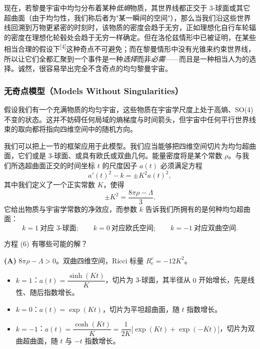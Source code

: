 现在，若黎曼宇宙中均匀分布着某种\emph{低熵}物质，其世界线都正交于 3-球面或其它超曲面（由于均匀性，我们称后者为"某一瞬间的空间"），那么当我们沿这些世界线回溯到万物更紧密的时刻时，该物质的密度会趋于无穷，正如理想化自行车轮辐的密度在理想化轮毂处会趋于无穷一样确定。但在洛伦兹情形中已被证明，在某些相当合理的假设下\textsuperscript{[4]}这种奇点不可避免；而在黎曼情形中没有光锥来约束世界线，所以让它们全都汇聚到一个事件是一种\emph{选择}而非\emph{必需}——而且是一种相当人为的选择。诚然，很容易举出完全不含奇点的均匀黎曼宇宙。

\subsubsection{无奇点模型（Models Without Singularities）}

假设我们有一个充满物质的均匀宇宙，这些物质在宇宙学尺度上处于高熵、SO(4) 不变的状态。这并不妨碍任何局域的熵梯度与时间箭头，但宇宙中任何平行世界线束的取向都将指向四维空间中的随机方向。

我们可以把上一节的框架应用于此模型。我们应当能够把四维空间切片为均匀超曲面，它们或是 3-球面、或具有欧氏或双曲几何。能量密度将是某个常数 $\rho$。与我们所选超曲面正交的时间坐标 $t$ 的尺度因子 $a(t)$ 必须满足方程
\begin{equation*}
a'(t)^{2}-k=\pm K^{2}a(t)^{2},
\tag{6}
\end{equation*}
其中我们定义了一个正实常数 $K$，使得
\begin{equation*}
\pm K^{2}=\frac{8\pi\rho-\Lambda}{3}.
\end{equation*}
它给出物质与宇宙学常数的净效应，而参数 $k$ 告诉我们所拥有的是何种均匀超曲面：
\begin{equation*}
k=1\ \text{对应 3-球面};\qquad
k=0\ \text{对应欧氏空间};\qquad
k=-1\ \text{对应双曲空间}.
\end{equation*}

方程 (6) 有哪些可能的解？

\textbf{(A)} $8\pi\rho-\Lambda>0$。双曲四维空间，Ricci 标量 $R_{c}^{c}=-12K^{2}$。
\begin{itemize}
  \item $k=1$：$a(t)=\dfrac{\sinh(Kt)}{K}$，切片为 3-球面，其半径从 $0$ 开始增长，先是线性、随后指数增长。
  \item $k=0$：$a(t)=\exp(Kt)$，切片为平坦超曲面，随 $t$ 指数增长。
  \item $k=-1$：$a(t)=\dfrac{\cosh(Kt)}{K}=\dfrac{1}{2K}\bigl[\exp(Kt)+\exp(-Kt)\bigr]$，切片为双曲超曲面，随 $t$ 与 $-t$ 指数增长。
\end{itemize}


